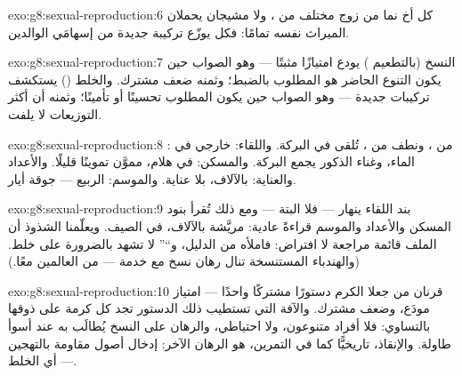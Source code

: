 \begin{solution}{exo:g8:sexual-reproduction:6}
كل أخ نما من زوج مختلف من ، ولا مشيجان يحملان الميراث نفسه
تمامًا: فكل  يوزّع تركيبة جديدة من إسهامَي الوالدين.
\end{solution}

\begin{solution}{exo:g8:sexual-reproduction:7}
النسخ (بالتطعيم ) يودع امتيازًا مثبتًا --- وهو الصواب حين
يكون التنوع الحاضر هو المطلوب بالضبط؛ وثمنه ضعف مشترك. والخلط
() يستكشف تركيبات جديدة --- وهو الصواب حين يكون المطلوب
تحسينًا أو تأمينًا؛ وثمنه أن أكثر التوزيعات لا يلفت.
\end{solution}

\begin{solution}{exo:g8:sexual-reproduction:8}
:  من ، ونطف من ، تُلقى في البركة. واللقاء:
 خارجي في الماء، وغناء الذكور يجمع البركة. والمسكن:  في
هلام، مموَّن تموينًا قليلًا. والأعداد والعناية: بالآلاف، بلا
عناية. والموسم: الربيع --- جوقة أيار.
\end{solution}

\begin{solution}{exo:g8:sexual-reproduction:9}
بند اللقاء ينهار --- فلا  البتة --- ومع ذلك تُقرأ بنود المسكن
والأعداد والموسم قراءةً عادية:  مريَّشة بالآلاف، في الصيف.
ويعلّمنا الشذوذ أن الملف قائمة مراجعة لا افتراض: فاملأه من الدليل،
و``'' لا تشهد بالضرورة على خلط. (والهندباء المستنسخة 
تنال رهان نسخ مع خدمة  --- من العالمين معًا.)
\end{solution}

\begin{solution}{exo:g8:sexual-reproduction:10}
قرنان من  جعلا الكرم دستورًا مشتركًا واحدًا --- امتياز
مودَع، وضعف مشترك. والآفة التي تستطيب ذلك الدستور تجد كل كرمة على
ذوقها بالتساوي: فلا أفراد متنوعون، ولا احتياطي، والرهان على النسخ
يُطالَب به عند أسوأ طاولة. والإنقاذ، تاريخيًّا كما في التمرين، هو
الرهان الآخر: إدخال أصول مقاومة بالتهجين --- أي الخلط.
\end{solution}


